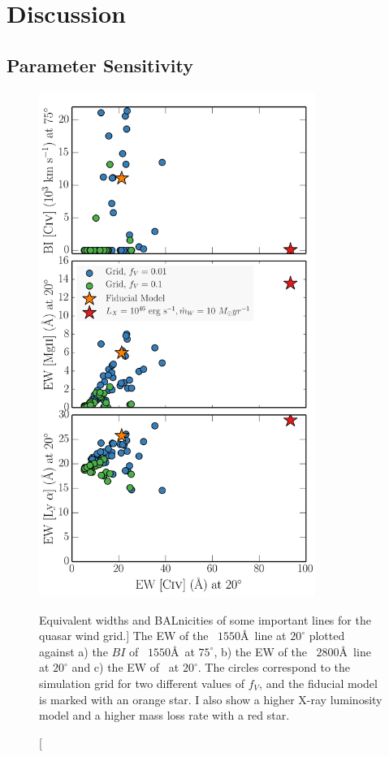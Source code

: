 \section{Discussion}
\label{sec:qso_discuss}

\subsection{Parameter Sensitivity}
\label{sec:param_sens}

\begin{figure}
\centering
\includegraphics[width=0.8\textwidth]
{figures/06-agnpaper/thesis_c4_grid.png}
\caption
[Equivalent widths and BALnicities of some important lines for the quasar wind grid.]
{
The EW of the \civ~$1550$\AA\ line at $20^\circ$ plotted against a) the 
$BI$ of \civ~$1550$\AA\ at $75^\circ$, b) the EW of the \mg~$2800$\AA\ line 
at $20^\circ$ and c) the EW of \la\ at $20^\circ$. The circles correspond 
to the simulation grid for two different values of $f_V$, and the fiducial 
model is marked with an orange star. 
I also show a higher X-ray luminosity model and a higher mass loss rate
with a red star.
}
\label{fig:grid}
\end{figure}

